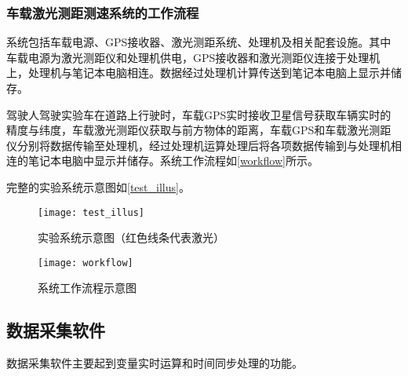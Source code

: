 \subsubsection{车载激光测距测速系统的工作流程}


系统包括车载电源、GPS接收器、激光测距系统、处理机及相关配套设施。其中车载电源为激光测距仪和处理机供电，GPS接收器和激光测距仪连接于处理机上，处理机与笔记本电脑相连。数据经过处理机计算传送到笔记本电脑上显示并储存。

驾驶人驾驶实验车在道路上行驶时，车载GPS实时接收卫星信号获取车辆实时的精度与纬度，车载激光测距仪获取与前方物体的距离，车载GPS和车载激光测距仪分别将数据传输至处理机，经过处理机运算处理后将各项数据传输到与处理机相连的笔记本电脑中显示并储存。系统工作流程如\autoref{workflow}所示。

完整的实验系统示意图如\autoref{test_illus}。

\begin{figure}[htpb]
	\centering
	\texttt{[image: test\_illus]}
	\caption{实验系统示意图（红色线条代表激光）}
	\label{test_illus}
\end{figure}


\begin{figure}[htpb]
	\centering
	\texttt{[image: workflow]}
	\caption{系统工作流程示意图}
	\label{workflow}
\end{figure}


\subsection{数据采集软件}

数据采集软件主要起到变量实时运算和时间同步处理的功能。

